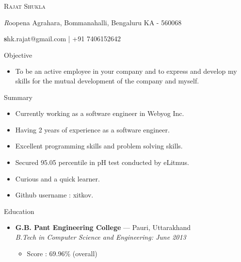 \documentclass[11pt,oneside]{article}
\makeatletter
\newcommand{\name}{Rajat Shukla}
\newcommand{\addr}{Roopena Agrahara, Bommanahalli, Bengaluru KA - 560068}
\newcommand{\contact}{shk.rajat@gmail.com | +91 7406152642}
\newcommand{\bigname}[1]{
  \begin{center}\fontfamily{phv}\selectfont\Huge\scshape#1\end{center}
}
\newcommand{\bignamenew}[1]{
  \begin{center}\selectfont\Huge\scshape#1\end{center}
}
\newcommand{\addrinfo}[1]{
  \begin{center}\selectfont\small\textit#1\end{center}
}
\newcommand{\contactinfo}[1]{
  \begin{center}\selectfont\small\textbf#1\end{center}
}
\newcommand{\resdescpara}[1]{
  \vspace{-5pt}
\item
  #1
}
\newenvironment{ressection}[1]{
  \vspace{4pt}
	     {\fontfamily{phv}\selectfont\Large#1}
	     \begin{itemize}
	       \vspace{3pt}
}{
	     \end{itemize}
}
\newcommand{\resitem}[1]{
  \vspace{-4pt}
\item \begin{flushleft} #1 \end{flushleft}
}
\newcommand{\ressubitem}[1]{
  \vspace{-1pt}
\item \begin{flushleft} #1 \end{flushleft}
}
\newcommand{\resbigitem}[3]{
  \vspace{-5pt}
\item
  \textbf{#1} --- #2 \\
  \textit{#3}
}
\newenvironment{ressubsec}[3]{
  \resbigitem{#1}{#2}{#3}
  \vspace{-2pt}
  \begin{itemize}
}{
  \end{itemize}
}
\makeatother
\begin{document}



\bigname{\name}

\vspace{2 pt}
\addrinfo{\addr}

\contactinfo{\contact}
\vspace{8 pt}


\begin{ressection}{Objective}
  \resdescpara{To be an active employee in your company and to express and develop my skills for the mutual development of the company and myself.}
\end{ressection}


\begin{ressection}{Summary}
  \resitem{Currently working as a software engineer in Webyog Inc.}
  \resitem{Having 2 years of experience as a software engineer.}
  \resitem{Excellent programming skills and problem solving skills.}
  \resitem{Secured 95.05 percentile in pH test conducted by eLitmus.}
  \resitem{Curious and a quick learner.}  
  \resitem{Github username : xitkov.}
\end{ressection}



\begin{ressection}{Education}
  \begin{ressubsec}{G.B. Pant Engineering College}{Pauri, Uttarakhand}{B.Tech in Computer Science and Engineering: June 2013}
	\ressubitem{Score : 69.96\% (overall)}
  \end{ressubsec}
\end{ressection}

\end{document}
